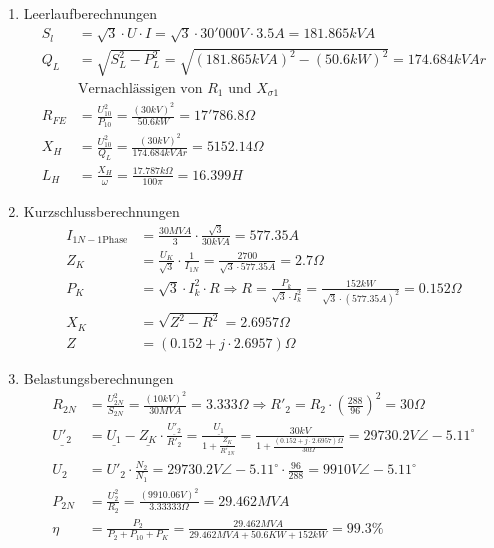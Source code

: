 \begin{enumerate}
\item Leerlaufberechnungen
\begin{align*}
	S_l &= \sqrt{3} \cdot U\cdot I = \sqrt{3} \cdot 30'000V\cdot 3.5A = 181.865kVA\\
	Q_L&= \sqrt{S_L^2-P_L^2} = \sqrt{(181.865kVA)^2-(50.6kW)^2} = 174.684kVAr\\
	&\textrm{Vernachlässigen von }R_1 \textrm{ und } X_{\sigma1}\\
	R_{FE}&=\frac{U_{10}^2}{P_{10}} = \frac{(30kV)^2}{50.6kW} = 17'786.8\Omega\\
	X_H &= \frac{U_{10}^2}{Q_L} = \frac{(30kV)^2}{174.684kVAr} = 5152.14\Omega\\
	L_H &= \frac{X_H}{\omega} = \frac{17.787k\Omega}{100\pi} = 16.399H
\end{align*}
\item Kurzschlussberechnungen
\begin{align*}
	I_{1N - 1\textrm{Phase}} &= \frac{30MVA}{3}\cdot \frac{\sqrt{3}}{30kVA} = 577.35A\\
	Z_K &= \frac{U_K}{\sqrt{3}}\cdot \frac{1}{I_{1N}} = \frac{2700}{\sqrt{3}\cdot 577.35A} = 2.7\Omega	\\
	P_K &= \sqrt{3}\cdot I_k^2\cdot R \Rightarrow R =\frac{P_k}{\sqrt{3}\cdot I_k^2} = \frac{152kW}{\sqrt{3}\cdot (577.35A)^2} = 0.152\Omega\\
	X_K &= \sqrt{Z^2 - R^2} = 2.6957\Omega\\
	Z &= (0.152+j\cdot 2.6957)\Omega
\end{align*}
\item Belastungsberechnungen
\begin{align*}
R_{2N}&= \frac{U^2_{2N}}{S_{2N}} = \frac{(10kV)^2}{30MVA} = 3.333\Omega \Rightarrow R'_2 = R_2\cdot  \left(\frac{288}{96}\right)^2 = 30\Omega\\ 
\underline{U'_2} &= \underline{U_1} - \underline{Z_K} \cdot \frac{\underline{U'_2}}{R'_2} = \frac{\underline{U_1}}{1+\frac{\underline{Z_K}}{R'_{2N}}} = \frac{30kV}{1+\frac{(0.152+j\cdot 2.6957)\Omega}{30\Omega}} = 29730.2V\angle -5.11^\circ\\
U_2 &= U'_2\cdot \frac{N_2}{N_1} = 29730.2V\angle -5.11^\circ \cdot \frac{96}{288} = 9910V\angle -5.11^\circ\\
P_{2N} &= \frac{U_2^2}{R_2} =\frac{(9910.06V)^2}{3.33333\Omega} = 29.462MVA\\
\eta &= \frac{P_2}{P_2+P_{10}+P_K} = \frac{29.462MVA}{29.462MVA+50.6KW+152kW} = 99.3\%
\end{align*}
\end{enumerate}





